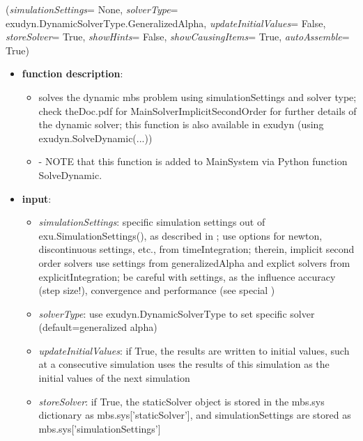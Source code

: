 \ei

%
\begin{flushleft}
\label{sec:mainsystemextensions:SolveDynamic}
({\it simulationSettings}= None, {\it solverType}= exudyn.DynamicSolverType.GeneralizedAlpha, {\it updateInitialValues}= False, {\it storeSolver}= True, {\it showHints}= False, {\it showCausingItems}= True, {\it autoAssemble}= True)
\end{flushleft}
\setlength{\itemindent}{0.7cm}
\begin{itemize}[leftmargin=0.7cm]
\item[--]
{\bf function description}: \vspace{-6pt}
\begin{itemize}[leftmargin=1.2cm]
\setlength{\itemindent}{-0.7cm}
\item[]solves the dynamic mbs problem using simulationSettings and solver type; check theDoc.pdf for MainSolverImplicitSecondOrder for further details of the dynamic solver; this function is also available in exudyn (using exudyn.SolveDynamic(...))
\item[]- NOTE that this function is added to MainSystem via Python function SolveDynamic.
\end{itemize}
\item[--]
{\bf input}: \vspace{-6pt}
\begin{itemize}[leftmargin=1.2cm]
\setlength{\itemindent}{-0.7cm}
\item[]{\it simulationSettings}: specific simulation settings out of exu.SimulationSettings(), as described in ; use options for newton, discontinuous settings, etc., from timeIntegration; therein, implicit second order solvers use settings from generalizedAlpha and explict solvers from explicitIntegration; be careful with settings, as the influence accuracy (step size!), convergence and performance (see special )
\item[]{\it solverType}: use exudyn.DynamicSolverType to set specific solver (default=generalized alpha)
\item[]{\it updateInitialValues}: if True, the results are written to initial values, such at a consecutive simulation uses the results of this simulation as the initial values of the next simulation
\item[]{\it storeSolver}: if True, the staticSolver object is stored in the mbs.sys dictionary as mbs.sys['staticSolver'], and simulationSettings are stored as mbs.sys['simulationSettings']

\end{itemize}
\end{itemize}
